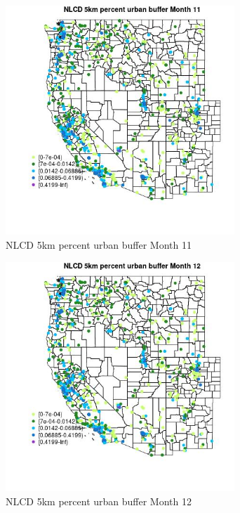 \begin{figure} 
\centering  
\includegraphics[width=0.77\textwidth]{Code_Outputs/Report_ML_input_PM25_Step4_part_f_de_duplicated_aveswNAs_MapObsMo11NLCD_5km_percent_urban_buffer.jpg} 
\caption{\label{fig:Report_ML_input_PM25_Step4_part_f_de_duplicated_aveswNAsMapObsMo11NLCD_5km_percent_urban_buffer}NLCD 5km percent urban buffer Month 11} 
\end{figure} 
 

\clearpage 

\begin{figure} 
\centering  
\includegraphics[width=0.77\textwidth]{Code_Outputs/Report_ML_input_PM25_Step4_part_f_de_duplicated_aveswNAs_MapObsMo12NLCD_5km_percent_urban_buffer.jpg} 
\caption{\label{fig:Report_ML_input_PM25_Step4_part_f_de_duplicated_aveswNAsMapObsMo12NLCD_5km_percent_urban_buffer}NLCD 5km percent urban buffer Month 12} 
\end{figure} 
 

